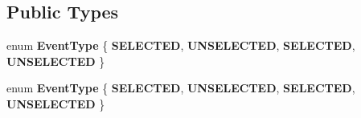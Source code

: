 \subsection*{Public Types}
\begin{DoxyCompactItemize}
\item 
\mbox{\label{classui_1_1TabHeader_a03b8ac7a141ba8fca5a3d0d1997cb325}} 
enum {\bfseries Event\+Type} \{ {\bfseries S\+E\+L\+E\+C\+T\+ED}, 
{\bfseries U\+N\+S\+E\+L\+E\+C\+T\+ED}, 
{\bfseries S\+E\+L\+E\+C\+T\+ED}, 
{\bfseries U\+N\+S\+E\+L\+E\+C\+T\+ED}
 \}
\item 
\mbox{\label{classui_1_1TabHeader_a03b8ac7a141ba8fca5a3d0d1997cb325}} 
enum {\bfseries Event\+Type} \{ {\bfseries S\+E\+L\+E\+C\+T\+ED}, 
{\bfseries U\+N\+S\+E\+L\+E\+C\+T\+ED}, 
{\bfseries S\+E\+L\+E\+C\+T\+ED}, 
{\bfseries U\+N\+S\+E\+L\+E\+C\+T\+ED}
 \}
\end{DoxyCompactItemize}
